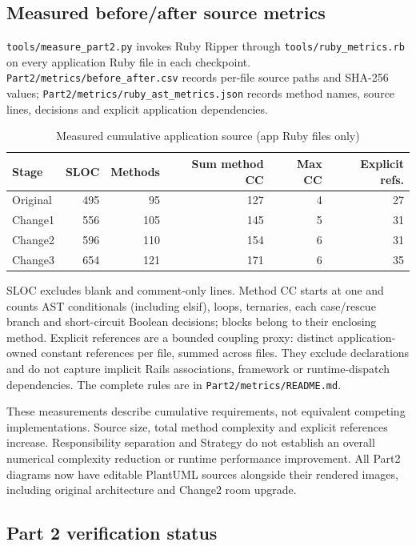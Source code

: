 \documentclass[10pt,a4paper]{article}
\newcommand{\code}[1]{\texttt{\small #1}}
\begin{document}
\subsection{Measured before/after source metrics}

\code{tools/measure\_part2.py} invokes Ruby Ripper through \code{tools/ruby\_metrics.rb} on every application Ruby file in each checkpoint. \code{Part2/metrics/before\_after.csv} records per-file source paths and SHA-256 values; \code{Part2/metrics/ruby\_ast\_metrics.json} records method names, source lines, decisions and explicit application dependencies.

\begin{table}[H]
\centering
\caption{Measured cumulative application source (app Ruby files only)}
\begin{tabular}{lrrrrr}
\toprule
Stage & SLOC & Methods & Sum method CC & Max CC & Explicit refs.\\
\midrule
Original & 495 & 95 & 127 & 4 & 27\\
Change1 & 556 & 105 & 145 & 5 & 31\\
Change2 & 596 & 110 & 154 & 6 & 31\\
Change3 & 654 & 121 & 171 & 6 & 35\\
\bottomrule
\end{tabular}
\end{table}

SLOC excludes blank and comment-only lines. Method CC starts at one and counts AST conditionals (including elsif), loops, ternaries, each case/rescue branch and short-circuit Boolean decisions; blocks belong to their enclosing method. Explicit references are a bounded coupling proxy: distinct application-owned constant references per file, summed across files. They exclude declarations and do not capture implicit Rails associations, framework or runtime-dispatch dependencies. The complete rules are in \code{Part2/metrics/README.md}.

These measurements describe cumulative requirements, not equivalent competing implementations. Source size, total method complexity and explicit references increase. Responsibility separation and Strategy do not establish an overall numerical complexity reduction or runtime performance improvement. All Part2 diagrams now have editable PlantUML sources alongside their rendered images, including original architecture and Change2 room upgrade.

\subsection{Part 2 verification status}
\end{document}
